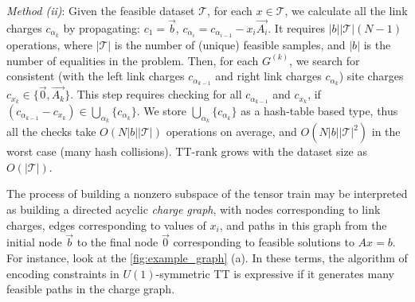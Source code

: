 \documentclass{article}
\theoremstyle{plain}
\theoremstyle{definition}
\theoremstyle{remark}
\begin{document}
    \textit{Method (ii)}: Given the feasible dataset $\mathcal{T}$, for each $x\in \mathcal{T}$, we calculate all the link charges $c_{\alpha_k}$ by propagating: $c_{1} = \vec{b}$, $c_{\alpha_{i}} = c_{\alpha_{i-1}}-x_i\vec{A_i}$. It requires $|b||\mathcal{T}| (N-1)$ operations, where $|\mathcal{T}|$ is the number of (unique) feasible samples, and $|b|$ is the number of equalities in the problem. Then, for each $G^{(k)}$, we search for consistent (with the left link charges $c_{\alpha_{k-1}}$ and right link charges $c_{\alpha_k}$) site charges $c_{x_k} \in \{\vec{0}, \vec{A_k}\}$. This step requires checking for all $c_{\alpha_{k-1}}$ and $c_{x_k}$, if $(c_{\alpha_{k-1}}-c_{x_k}) \in \bigcup_{\alpha_k}\{c_{\alpha_k}\}$. We store $\bigcup_{\alpha_k}\{c_{\alpha_k}\}$ as a hash-table based type, thus all the checks take $O(N|b||\mathcal{T}|)$ operations on average, and $O(N|b||\mathcal{T}|^2)$ in the worst case (many hash collisions). TT-rank grows with the dataset size as $O(|\mathcal{T}|)$.
    
The process of building a nonzero subspace of the tensor train may be interpreted as building a directed acyclic \textit{charge graph}, with nodes corresponding to link charges, edges corresponding to values of $x_i$, and paths in this graph from the initial node $\vec{b}$ to the final node $\vec{0}$ corresponding to feasible solutions to $Ax=b$. For instance, look at the \cref{fig:example_graph} (a). In these terms, the algorithm of encoding constraints in $U(1)$-symmetric TT is expressive if it generates many feasible paths in the charge graph.
\end{document}
